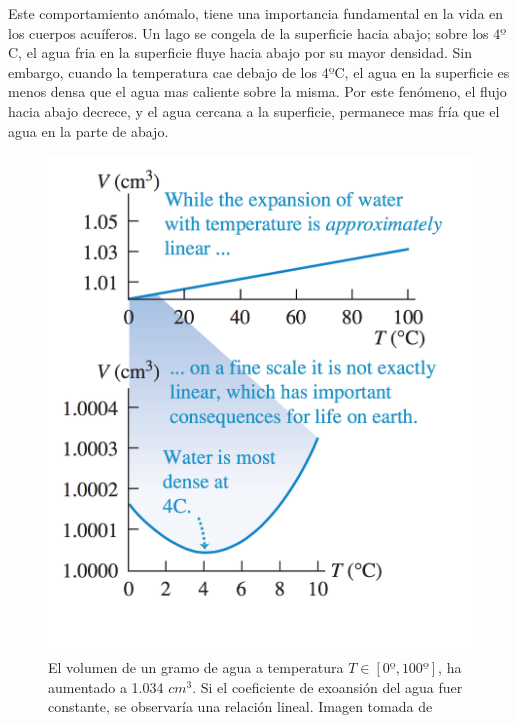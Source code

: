 \documentclass[DIV=calc, paper=a4, fontsize=11pt, twocolumn, spanish]{scrartcl}	 %
\begin{document}
Este comportamiento anómalo, tiene una importancia fundamental en la vida en los cuerpos acuíferos. Un lago se congela de la superficie hacia abajo; sobre los $4º$C, el agua fria en la superficie fluye hacia abajo por su mayor densidad. Sin embargo, cuando la temperatura cae debajo de los $4º$C, el agua en la superficie es menos densa que el agua mas caliente sobre la misma. Por este fenómeno, el flujo hacia abajo decrece, y el agua cercana a la superficie, permanece mas fría que el agua en la parte de abajo.

\begin{figure}[htbp]
\centering
	\includegraphics[scale=0.47]{data/img/figure01}
	\caption{El volumen de un gramo de agua a temperatura $T \in [0º, 100º]$, ha aumentado a 1.034 $cm^3$. Si el coeficiente de exoansión del agua fuer constante, se observaría una relación lineal. Imagen tomada de \cite{young2011sears}}
\end{figure}
\end{document}
